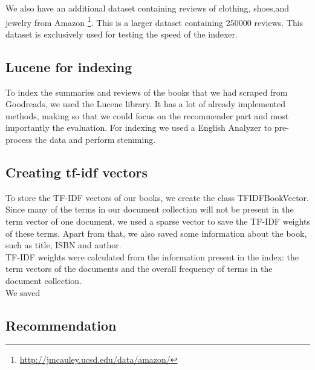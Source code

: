 \documentclass[10pt,a4paper]{paper}
\begin{document}
We also have an additional dataset containing reviews of clothing, shoes,and jewelry from Amazon \footnote{\url{http://jmcauley.ucsd.edu/data/amazon/}}. This is a larger dataset containing 250000 reviews. This dataset is exclusively used for testing the speed of the indexer.

\subsection{Lucene for indexing}

To index the summaries and reviews of the books that we had scraped from Goodreads, we used the Lucene library. It has a lot of already implemented methods, making so that we could focus on the recommender part and most importantly the evaluation. For indexing we used a English Analyzer to pre-process the data and perform stemming.

\subsection{Creating tf-idf vectors}

To store the TF-IDF vectors of our books, we create the class TFIDFBookVector. Since many of the terms in our document collection will not be present in the term vector of one document, we used a sparse vector to save the TF-IDF weights of these terms. Apart from that, we also saved some information about the book, such as title, ISBN and author.\\
TF-IDF weights were calculated from the information present in the index: the term vectors of the documents and the overall frequency of terms in the document collection.\\
We saved 


\subsection{Recommendation}
\end{document}
